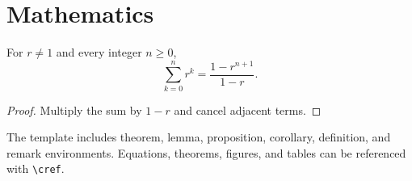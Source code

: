 \section{Mathematics}

\begin{theorem}
  For $r\neq 1$ and every integer $n\geq 0$,
  \[
    \sum_{k=0}^{n}r^k=\frac{1-r^{n+1}}{1-r}.
  \]
\end{theorem}

\begin{proof}
  Multiply the sum by $1-r$ and cancel adjacent terms.
\end{proof}

The template includes theorem, lemma, proposition, corollary, definition, and remark environments.
Equations, theorems, figures, and tables can be referenced with \verb|\cref|.

